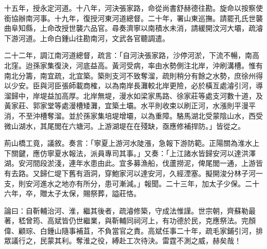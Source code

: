 \begin{pinyinscope}
十五年，授永定河道。十八年，河決張家路，命從尚書舒赫德往勘。旋命以按察使銜協辦南河事。十九年，復授河東河道總督。二十年，署山東巡撫。請罷孔氏世襲曲阜知縣，上命改授世襲六品官。尋奏濟寧以南積水未消，請緩開汶河大壩，疏濬下游河道。上命白鍾山往勘南河，文武各官聽調遣。

二十二年，調江南河道總督，疏言：「自河決張家路，沙停河淤，下流不暢，南高北窪。迨孫家集復決，河底益高。黃河受病，率由水勢側注北岸，沖刷溝槽。惟有南北分籌，南宜疏，北宜築。築則支河不致奪溜，疏則稍分有餘之水勢，庶徐州得以少安。臣與河臣張師載商榷，以為南岸長灘較北岸更險，必於橫亙處濬引河，導溜歸中，岸堤益加高厚。北岸無堤，漫水如梁家馬路、徐家莊等處支河數十道，及黃家莊、郭家堂等處漫槽矮灘，宜築土壩。水平則收束以刷正河，水漲則平漫平消，不至沖槽奪溜。並於孫家集培堤增壩，以為重障。駱馬湖北受蒙陰山水，西受微山湖水，其尾閭在六塘河。上游湖堤在在殘缺，亟應修補捍防。」皆從之。

荊山橋工竟，議敘。奏言：「寧夏上游河水陡漲，急報下游防範。正陽關為淮水上下關鍵，應仿寧夏水報法，派員專司其事。」又奏：「上江諸水皆歸安河以達洪澤湖。安河間段淤淺，連年水患由此。宜多募漁船，伐蘆撈泥，俾尾閭一通，上游皆有去路。又歸仁堤下舊有涵洞，穿鮑家河以達安河，久經湮塞。擬開浚分林子河一支，則安河進水之地亦有所分，患可漸減。」報聞。二十三年，加太子少保。二十六年，卒，贈太子太保，賜祭葬，謚莊恪。

論曰：自靳輔治河、淮，繼其後者，疏濬修築，守成法惟謹。世宗朝，齊蘇勒最著，嵇曾筠、高斌皆仍世繼業，與靳輔同祠河上，有功德於民，克應祭法。完顏偉、顧琮、白鍾山隨事補苴，不負當官之責。高斌任事二十年，疏毛家鋪引河，排眾議行之，民蒙其利。奪淮之役，縛赴工次待決。雷霆不測之威，赫矣哉！


\end{pinyinscope}